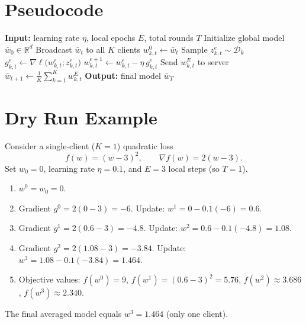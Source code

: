 \documentclass{article}
\newcommand{\R}{\mathbb{R}}
\begin{document}
\section*{Pseudocode}
\begin{algorithm}[H]
\caption{Local‑SGD (Federated Averaging)}
\begin{algorithmic}[1]
\STATE \textbf{Input:} learning rate $\eta$, local epochs $E$, total rounds $T$
\STATE Initialize global model $\bar w_0\in\R^d$
    \STATE Broadcast $\bar w_t$ to all $K$ clients
        \STATE $w_{k,t}^{0}\gets \bar w_t$
            \STATE Sample $z_{k,t}^{e}\sim\mathcal{D}_k$
            \STATE $g_{k,t}^{e}\gets \nabla\ell\big(w_{k,t}^{e};z_{k,t}^{e}\big)$
            \STATE $w_{k,t}^{e+1}\gets w_{k,t}^{e}-\eta\,g_{k,t}^{e}$ 
        \ENDFOR
        \STATE Send $w_{k,t}^{E}$ to server
    \ENDFOR
    \STATE $\displaystyle \bar w_{t+1}\gets\frac1K\sum_{k=1}^{K} w_{k,t}^{E}$ 
\ENDFOR
\STATE \textbf{Output:} final model $\bar w_T$
\end{algorithmic}
\end{algorithm}

\section*{Dry Run Example}
Consider a single‑client ($K=1$) quadratic loss
\[
f(w)=(w-3)^2,\qquad \nabla f(w)=2(w-3).
\]
Set $w_0=0$, learning rate $\eta=0.1$, and $E=3$ local steps (so $T=1$).

\begin{enumerate}[label={Step \arabic*:}]
\item $w^{0}=w_0=0$.
\item Gradient $g^{0}=2(0-3)=-6$. Update:
      $w^{1}=0-0.1(-6)=0.6$.
\item Gradient $g^{1}=2(0.6-3)=-4.8$. Update:
      $w^{2}=0.6-0.1(-4.8)=1.08$.
\item Gradient $g^{2}=2(1.08-3)=-3.84$. Update:
      $w^{3}=1.08-0.1(-3.84)=1.464$.
\item Objective values:
      $f(w^{0})=9$, $f(w^{1})=(0.6-3)^2=5.76$, $f(w^{2})\approx3.686$, $f(w^{3})\approx2.340$.
\end{enumerate}
The final averaged model equals $w^{3}=1.464$ (only one client).
\end{document}
